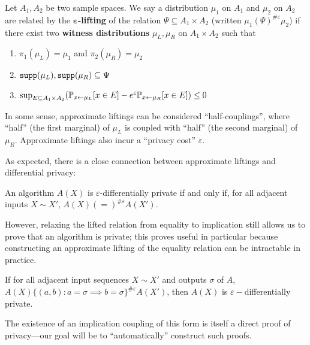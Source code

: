\begin{defn}
    Let $A_1, A_2$ be two sample spaces. We say a distribution $\mu_1$ on $A_1$ and $\mu_2$ on $A_2$ are related by the $\mathbf{\varepsilon}$\textbf{-lifting} of the relation $\Psi\subseteq A_1\times A_2$ (written $\mu_1(\Psi)^{\#\varepsilon}\mu_2$) if there exist two \textbf{witness distributions} $\mu_L, \mu_R$ on $A_1\times A_2$ such that\begin{enumerate}
        \item $\pi_1(\mu_L) = \mu_1$ and $\pi_2(\mu_R) = \mu_2$
        \item $\texttt{supp}(\mu_L), \texttt{supp}(\mu_R)\subseteq \Psi$
        \item $\sup_{E\subseteq A_1\times A_2}(\mathbb{P}_{x\gets \mu_L}[x\in E]- e^\varepsilon \mathbb{P}_{x\gets \mu_R}[x\in E])\leq 0$
    \end{enumerate}
\end{defn}

In some sense, approximate liftings can be considered ``half-couplings'', where ``half'' (the first marginal) of $\mu_L$ is coupled with ``half'' (the second marginal) of $\mu_R$. Approximate liftings also incur a ``privacy cost'' $\varepsilon$. 

As expected, there is a close connection between approximate liftings and differential privacy:

\begin{thm}
    An algorithm $A(X)$ is $\varepsilon$-differentially private if and only if, for all adjacent inputs $X\sim X'$, $A(X)(=)^{\#\varepsilon}A(X')$.
\end{thm}

However, relaxing the lifted relation from equality to implication still allows us to prove that an algorithm is private; this proves useful in particular because constructing an approximate lifting of the equality relation can be intractable in practice. 

\begin{thm}\label{implicationcouplingthm}
    If for all adjacent input sequences $X\sim X'$ and outputs $\sigma$ of $A$, $A(X)\{(a, b): a=\sigma\implies b=\sigma\}^{\#\varepsilon}A(X')$, then $A(X)$ is $\varepsilon-$differentially private.
\end{thm}

The existence of an implication coupling of this form is itself a direct proof of privacy---our goal will be to ``automatically'' construct such proofs. 

